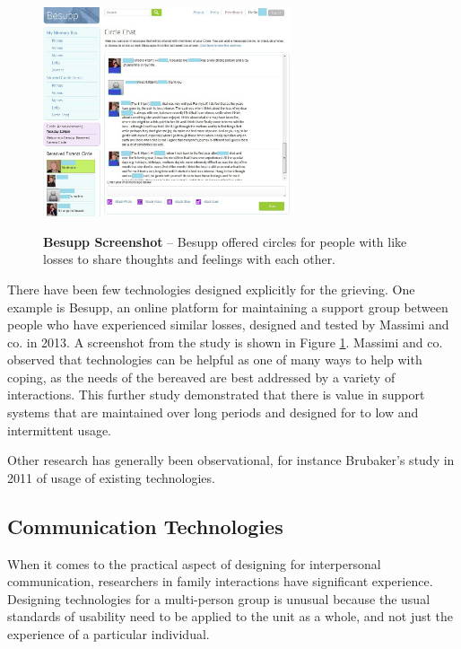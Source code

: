   \begin{figure}
  \caption{\textbf{Besupp Screenshot} --
  Besupp offered circles for people with like losses to share thoughts
  and feelings with each other.
  }
  \centering
  \includegraphics[width=0.65\textwidth]{besupp.png}
  \label{fig:besupp}
  \end{figure}

  There have been few technologies designed explicitly for the grieving. One
  example is Besupp, an online platform for maintaining a support group between
  people who have experienced similar losses, designed and tested by Massimi and
  co. in 2013. \cite{mm13}
  A screenshot from the study is shown in Figure \ref{fig:besupp}.
  Massimi and co. observed that technologies can be helpful as
  one of many ways to help with coping, as the needs of the bereaved are best
  addressed by a variety of interactions.
  This further study demonstrated that
  there is value in support systems that are maintained over long periods and
  designed for to low and intermittent usage.

  Other research has generally been observational, for instance Brubaker's study
  in 2011 of usage of existing technologies. \cite{brubaker11}

  \subsection{Communication Technologies}
  When it comes to the practical aspect of designing for interpersonal
  communication, researchers in family interactions have significant experience.
  Designing technologies for a multi-person group is unusual because the usual
  standards of usability need to be applied to the unit as a whole, and not just
  the experience of a particular individual. \cite{neustaedter12}

